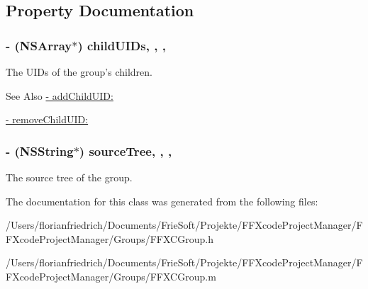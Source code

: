\subsection{Property Documentation}
\hypertarget{interface_f_f_x_c_group_a3da566a8c5dcf0da93f7ea2ea7a5d310}{
\subsubsection[{child\-U\-I\-Ds}]{\setlength{\rightskip}{0pt plus 5cm}-\/ (N\-S\-Array$\ast$) child\-U\-I\-Ds\hspace{0.3cm}{\ttfamily [read]}, {\ttfamily [write]}, {\ttfamily [nonatomic]}, {\ttfamily [strong]}}}\label{interface_f_f_x_c_group_a3da566a8c5dcf0da93f7ea2ea7a5d310}
The U\-I\-Ds of the group's children. \begin{DoxySeeAlso}{See Also}
\hyperlink{interface_f_f_x_c_group_a5ec273f715087b1a1741cdff53bec74b}{-\/ add\-Child\-U\-I\-D\-:} 

\hyperlink{interface_f_f_x_c_group_a5306d17ed98b2a84e52dfe52031d37cd}{-\/ remove\-Child\-U\-I\-D\-:} 
\end{DoxySeeAlso}
\hypertarget{interface_f_f_x_c_group_a7e2268306d098ba91483be6df120fc5a}{
\subsubsection[{source\-Tree}]{\setlength{\rightskip}{0pt plus 5cm}-\/ (N\-S\-String$\ast$) source\-Tree\hspace{0.3cm}{\ttfamily [read]}, {\ttfamily [write]}, {\ttfamily [nonatomic]}, {\ttfamily [strong]}}}\label{interface_f_f_x_c_group_a7e2268306d098ba91483be6df120fc5a}
The source tree of the group. 

The documentation for this class was generated from the following files\-:\begin{DoxyCompactItemize}
\item 
/\-Users/florianfriedrich/\-Documents/\-Frie\-Soft/\-Projekte/\-F\-F\-Xcode\-Project\-Manager/\-F\-F\-Xcode\-Project\-Manager/\-Groups/F\-F\-X\-C\-Group.\-h\item 
/\-Users/florianfriedrich/\-Documents/\-Frie\-Soft/\-Projekte/\-F\-F\-Xcode\-Project\-Manager/\-F\-F\-Xcode\-Project\-Manager/\-Groups/F\-F\-X\-C\-Group.\-m\end{DoxyCompactItemize}

